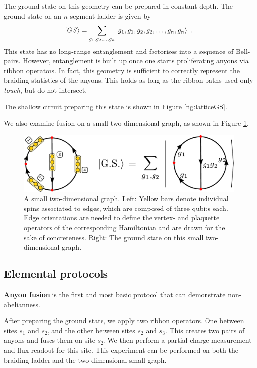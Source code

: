\documentclass[two column]{article}
\begin{document}
The ground state on this geometry can be prepared in constant-depth. The ground state on an $n$-segment ladder is given by
\begin{equation}
    \ket{GS} = \sum_{g_1,g_2,\ldots,g_n} \ket{g_1,g_1,g_2,g_2,\ldots,g_n,g_n} \;.
\end{equation}
This state has no long-range entanglement and factorises into a sequence of Bell-pairs. 
However, entanglement is built up once one starts proliferating anyons via ribbon operators.
In fact, this geometry is sufficient to correctly represent the braiding statistics of the anyons. This holds as long as the ribbon paths used only \emph{touch}, but do not intersect.

The shallow circuit preparing this state is shown in Figure \ref{fig:latticeGS}.

We also examine fusion on a small two-dimensional graph, as shown in Figure \ref{fig:basketball}.

\begin{figure}
    \centering
    \includegraphics[width=\linewidth]{Figures/basketball.pdf}
    \caption{A small two-dimensional graph. Left: Yellow bars denote individual spins associated to edges, which are composed of three qubits each. Edge orientations are needed to define the vertex- and plaquette operators of the corresponding Hamiltonian and are drawn for the sake of concreteness. Right: The ground state on this small two-dimensional graph.}
    \label{fig:basketball}
\end{figure}




\subsection{Elemental protocols}
\textbf{Anyon fusion}
is the first and most basic protocol that can demonstrate non-abelianness. 

After preparing the ground state, we apply two ribbon operators. One between sites $s_1$ and $s_2$, and the other between sites $s_2$ and $s_3$.
This creates two pairs of anyons and fuses them on site $s_2$. We then perform a partial charge measurement and flux readout for this site.
This experiment can be performed on both the braiding ladder and the two-dimensional small graph.
\end{document}
